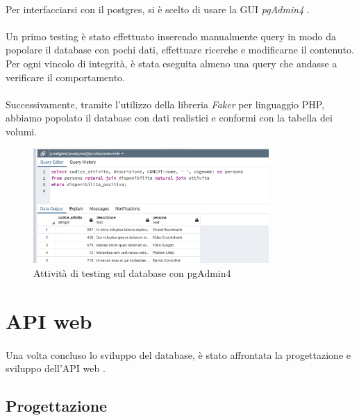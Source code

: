 \documentclass[11pt,a4paper,english]{article}
\begin{document}
\paragraph{} Per interfacciarsi con il postgres, si è scelto di usare la GUI \emph{pgAdmin4} \cite{pgadmin}.

\paragraph{} Un primo testing è stato effettuato inserendo manualmente query in modo da popolare il database con pochi dati, effettuare ricerche e modificarne il contenuto. Per ogni vincolo di integrità, è stata eseguita almeno una query che andasse a verificare il comportamento. 

\paragraph{} Successivamente, tramite l'utilizzo della libreria \emph{Faker} per linguaggio PHP, abbiamo popolato il database con dati realistici e conformi con la tabella dei volumi.

\begin{figure}[H]
    \centering
    \includegraphics[width=0.8\textwidth]{img/query_esempio.png}
    \caption{Attività di testing sul database con pgAdmin4}
\end{figure}



\section{API web}

\paragraph{} Una volta concluso lo sviluppo del database, è stato affrontata la progettazione e sviluppo dell'API web \cite{restapi}.

\subsection{Progettazione}
\end{document}
